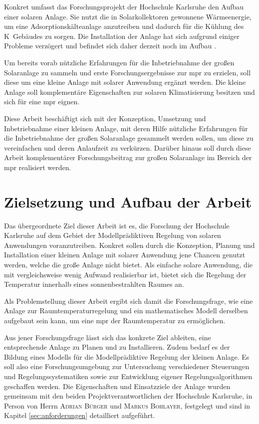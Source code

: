 Konkret umfasst das Forschungsprojekt der Hochschule Karlsruhe den Aufbau einer solaren Anlage. Sie nutzt die in Solarkollektoren gewonnene Wärmeenergie, um eine Adsorptionskälteanlage anzutreiben und dadurch für die Kühlung des K~Gebäudes zu sorgen. Die Installation der Anlage hat sich aufgrund einiger Probleme verzögert und befindet sich daher derzeit noch im Aufbau \cite{hska}.

Um bereits vorab nützliche Erfahrungen für die Inbetriebnahme der großen Solaranlage zu sammeln und erste Forschungsergebnisse zur \acrlong{mpr} zu erzielen, soll diese um eine kleine Anlage mit solarer Anwendung ergänzt werden. Die kleine Anlage soll komplementäre Eigenschaften zur solaren Klimatisierung besitzen und sich für eine \acrlong{mpr} eignen.

Diese Arbeit beschäftigt sich mit der Konzeption, Umsetzung und Inbetriebnahme einer kleinen Anlage, mit deren Hilfe nützliche Erfahrungen für die Inbetriebnahme der großen Solaranlage gesammelt werden sollen, um diese zu vereinfachen und deren Anlaufzeit zu verkürzen. Darüber hinaus soll durch diese Arbeit komplementärer Forschungsbeitrag zur großen Solaranlage im Bereich der \acrlong{mpr} realisiert werden.

\section{Zielsetzung und Aufbau der Arbeit}
\label{sec:ziel}

Das übergeordnete Ziel dieser Arbeit ist es, die Forschung der Hochschule Karlsruhe auf dem Gebiet der Modellprädiktiven Regelung von solaren Anwendungen voranzutreiben.
Konkret sollen durch die Konzeption, Planung und Installation einer kleinen Anlage mit solarer Anwendung jene Chancen genutzt werden, welche die große Anlage nicht bietet.
Als einfache solare Anwendung, die mit vergleichsweise wenig Aufwand realisierbar ist, bietet sich die Regelung der Temperatur innerhalb eines sonnenbestrahlten Raumes an.

Als Problemstellung dieser Arbeit ergibt sich damit die Forschungsfrage, wie eine Anlage zur Raumtemperaturregelung und ein mathematisches Modell derselben aufgebaut sein kann, um eine \acrlong{mpr} der Raumtemperatur zu ermöglichen.

Aus jener Forschungsfrage lässt sich das konkrete Ziel ableiten, eine entsprechende Anlage zu Planen und zu Installieren. 
Zudem bedarf es der Bildung eines Modells für die Modellprädiktive Regelung der kleinen Anlage.
Es soll also eine Forschungsumgebung zur Untersuchung verschiedener Steuerungen und Regelungssystematiken sowie zur Entwicklung eigener Regelungsalgorithmen geschaffen werden.
Die Eigenschaften und Einsatzziele der Anlage wurden gemeinsam mit den beiden Projektverantwortlichen der Hochschule Karlsruhe, in Person von Herrn \textsc{Adrian Bürger} und \textsc{Markus Bohlayer}, festgelegt und sind in Kapitel \ref{sec:anforderungen} detailliert aufgeführt.


